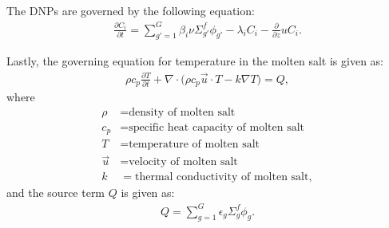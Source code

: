 \documentclass{anstrans}
\begin{document}
	The \glspl{DNP} are governed by the following equation:
%
\begin{align}
	\frac{\partial C_i}{\partial t} = \sum^G_{g'=1} \beta_i \nu \Sigma^f_{g'}
	\phi_{g'} - \lambda_i C_i - \frac{\partial}{\partial z} u C_i. \label{eq2}
\end{align}

	Lastly, the governing equation for temperature in the molten salt is given
	as:
%
\begin{align}
	\rho c_{p} \frac{\partial T}{\partial t} + \nabla \cdot \big( \rho
	c_{p} \overrightarrow{u} \cdot T - k \nabla T \big) = Q,
	\label{eq3}
\end{align}
%
	where
{\small
\begin{align}
	\rho &= \text{density of molten salt} \\
	 c_{p} &= \text{specific heat capacity of molten salt} \\
	 T &= \text{temperature of molten salt} \\
	 \overrightarrow{u} &= \text{velocity of molten salt} \\
	 k &= \text{thermal conductivity of molten salt},
\end{align}
}
	and the source term $Q$ is given as:
%
\begin{align}
Q = \sum^G_{g=1} \epsilon_g \Sigma_g^f \phi_g. \label{eq4}
\end{align}
\end{document}
